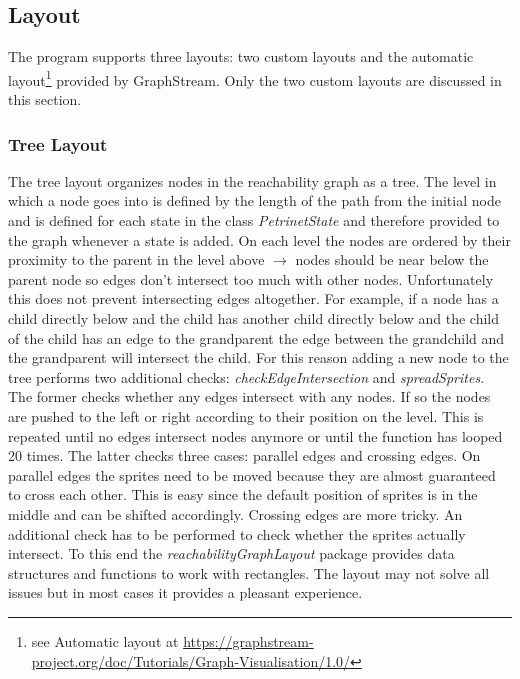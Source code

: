 \documentclass[10pt, a4paper]{article}
\begin{document}
\newpage

\subsection{Layout}
\label{label:layout}

The program supports three layouts: two custom layouts and the automatic layout\footnote{see Automatic layout at \url{https://graphstream-project.org/doc/Tutorials/Graph-Visualisation/1.0/}} provided by GraphStream. Only the two custom layouts are discussed in this section.

\subsubsection{Tree Layout}
\label{label:treeLayout}

The tree layout organizes nodes in the reachability graph as a tree. The level in which a node goes into is defined by the length of the path from the initial node and is defined for each state in the class \textit{PetrinetState} and therefore provided to the graph whenever a state is added. On each level the nodes are ordered by their proximity to the parent in the level above $\rightarrow$ nodes should be near below the parent node so edges don't intersect too much with other nodes. Unfortunately this does not prevent intersecting edges altogether. For example, if a node has a child directly below and the child has another child directly below and the child of the child has an edge to the grandparent the edge between the grandchild and the grandparent will intersect the child. For this reason adding a new node to the tree performs two additional checks: \textit{checkEdgeIntersection} and \textit{spreadSprites}. The former checks whether any edges intersect with any nodes. If so the nodes are pushed to the left or right according to their position on the level. This is repeated until no edges intersect nodes anymore or until the function has looped 20 times. The latter checks three cases: parallel edges and crossing edges. On parallel edges the sprites need to be moved because they are almost guaranteed to cross each other. This is easy since the default position of sprites is in the middle and can be shifted accordingly. Crossing edges are more tricky. An additional check has to be performed to check whether the sprites actually intersect. To this end the \textit{reachabilityGraphLayout} package provides data structures and functions to work with rectangles. The layout may not solve all issues but in most cases it provides a pleasant experience.
\end{document}
